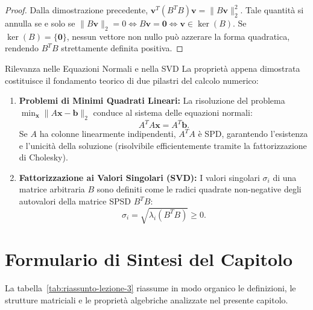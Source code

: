 \begin{proof}
Dalla dimostrazione precedente, $\mathbf{v}^T (B^T B) \mathbf{v} = \|B\mathbf{v}\|_2^2$. Tale quantit\`a si annulla se e solo se $\|B\mathbf{v}\|_2 = 0 \iff B\mathbf{v} = \mathbf{0} \iff \mathbf{v} \in \ker(B)$.
Se $\ker(B) = \{\mathbf{0}\}$, nessun vettore non nullo pu\`o azzerare la forma quadratica, rendendo $B^T B$ strettamente definita positiva.
\end{proof}

\begin{noteblock}{Rilevanza nelle Equazioni Normali e nella SVD}
La propriet\`a appena dimostrata costituisce il fondamento teorico di due pilastri del calcolo numerico:
\begin{enumerate}
    \item \textbf{Problemi di Minimi Quadrati Lineari:} La risoluzione del problema $\min_{\mathbf{x}} \|A\mathbf{x} - \mathbf{b}\|_2$ conduce al sistema delle equazioni normali:
    \begin{equation}
        A^T A \mathbf{x} = A^T \mathbf{b}.
    \end{equation}
    Se $A$ ha colonne linearmente indipendenti, $A^T A$ \`e SPD, garantendo l'esistenza e l'unicit\`a della soluzione (risolvibile efficientemente tramite la fattorizzazione di Cholesky).
    \item \textbf{Fattorizzazione ai Valori Singolari (SVD):} I valori singolari $\sigma_i$ di una matrice arbitraria $B$ sono definiti come le radici quadrate non-negative degli autovalori della matrice SPSD $B^T B$:
    \begin{equation}
        \sigma_i = \sqrt{\lambda_i(B^T B)} \ge 0.
    \end{equation}
\end{enumerate}
\end{noteblock}

\clearpage
\section{Formulario di Sintesi del Capitolo}

La tabella~\ref{tab:riassunto-lezione-3} riassume in modo organico le definizioni, le strutture matriciali e le propriet\`a algebriche analizzate nel presente capitolo.


